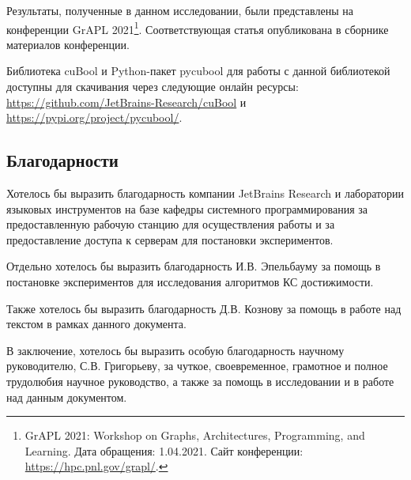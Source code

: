 Результаты, полученные в данном исследовании, были представлены на конференции GrAPL 2021\footnote{GrAPL 2021: Workshop on Graphs, Architectures, Programming, and Learning. Дата обращения: 1.04.2021. Сайт конференции: \url{https://hpc.pnl.gov/grapl/}.}. Соответствующая статья опубликована в сборнике материалов конференции.

Библиотека cuBool и Python-пакет pycubool для работы с данной библиотекой доступны для скачивания через следующие онлайн ресурсы: \url{https://github.com/JetBrains-Research/cuBool} и \url{https://pypi.org/project/pycubool/}.

\subsection*{Благодарности}

Хотелось бы выразить благодарность компании JetBrains Research и лаборатории языковых инструментов на базе кафедры системного программирования за предоставленную рабочую станцию для осуществления работы и за предоставление доступа к серверам для постановки экспериментов.

Отдельно хотелось бы выразить благодарность И.В. Эпельбауму за помощь в постановке экспериментов для исследования алгоритмов КС достижимости.

Также хотелось бы выразить благодарность Д.В. Кознову за помощь в работе над текстом в рамках данного документа.

В заключение, хотелось бы выразить особую благодарность научному руководителю, С.В. Григорьеву, за чуткое, своевременное, грамотное и полное трудолюбия научное руководство, а также за помощь в исследовании и в работе над данным документом. 

